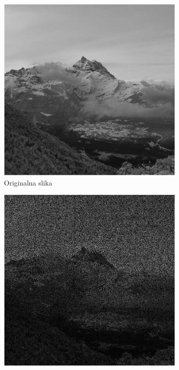 \begin{figure}[!ht]
    \centering
    \begin{subfigure}{0.49\linewidth}
        \includegraphics[width=\linewidth]{Poglavja/Slike/grayscale1000/slikaInput.png}
        \caption{Originalna slika}
    \end{subfigure}
    \hfill
    \begin{subfigure}{0.49\linewidth}
        \includegraphics[width=\linewidth]{Poglavja/Slike/grayscale1000/slikaInput35.png}

\end{subfigure}
\end{figure}
